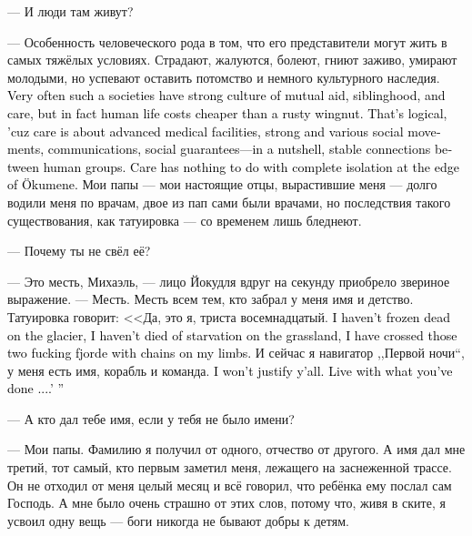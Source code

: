 \documentclass[a4paper,10pt,fleqn]{book}\usepackage{polyglossia}\setdefaultlanguage{english}\setotherlanguage{russian}\defaultfontfeatures{Ligatures=TeX,Mapping=tex-text}\usepackage{xcolor}\definecolor{lightgray}{HTML}{bbbbbb}\color{lightgray}\newcommand{\ml}[3]{\textcolor{black}{#3}}
\begin{document}
--- И люди там живут?

--- Особенность человеческого рода в том, что его представители могут жить в самых тяжёлых условиях.
Страдают, жалуются, болеют, гниют заживо, умирают молодыми, но успевают оставить потомство и немного культурного наследия.
\ml{$0$}
{Очень часто в таких обществах развита культура взаимопомощи, братства и заботы, но на деле человеческая жизнь там не стоит ржавой гайки.}
{Very often such a societies have strong culture of mutual aid, siblinghood, and care, but in fact human life costs cheaper than a rusty wingnut.}
\ml{$0$}
{Оно и понятно, ведь забота --- это развитая медицина, сильные и разнообразные общественные движения, коммуникации, социальные гарантии --- одним словом, стабильные связи между группами людей.}
{That's logical, 'cuz care is about advanced medical facilities, strong and various social movements, communications, social guarantees---in a nutshell, stable connections between human groups.}
\ml{$0$}
{Забота не имеет ничего общего с полной изоляцией на краю Эйкумене.}
{Care has nothing to do with complete isolation at the edge of Ökumene.}
Мои папы --- мои настоящие отцы, вырастившие меня --- долго водили меня по врачам, двое из пап сами были врачами, но последствия такого существования, как татуировка --- со временем лишь бледнеют.

--- Почему ты не свёл её?

--- Это месть, Михаэль, --- лицо Йокудля вдруг на секунду приобрело звериное выражение.
--- Месть.
Месть всем тем, кто забрал у меня имя и детство.
Татуировка говорит: <<Да, это я, триста восемнадцатый.
\ml{$0$}
{Я не умер от холода на леднике, я не сдох от голода в степи, я переплыл те два гребаных фьорда, скованный цепями по рукам и ногам.}
{I haven't frozen dead on the glacier, I haven't died of starvation on the grassland, I have crossed those two fucking fjorde with chains on my limbs.}
И сейчас я навигатор ,,Первой ночи``, у меня есть имя, корабль и команда.
\ml{$0$}
{Я не буду вас оправдывать.}
{I won't justify y'all.}
\ml{$0$}
{Живите с тем, что вы сделали...>>}
{Live with what you've done ....' ''}

--- А кто дал тебе имя, если у тебя не было имени?

--- Мои папы.
Фамилию я получил от одного, отчество от другого.
А имя дал мне третий, тот самый, кто первым заметил меня, лежащего на заснеженной трассе.
Он не отходил от меня целый месяц и всё говорил, что ребёнка ему послал сам Господь.
А мне было очень страшно от этих слов, потому что, живя в ските, я усвоил одну вещь --- боги никогда не бывают добры к детям.
\end{document}
